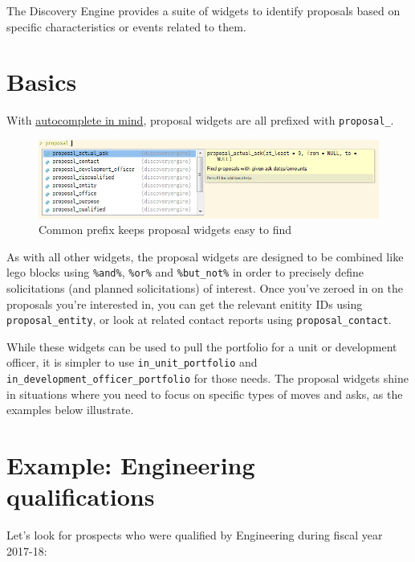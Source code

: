 \documentclass[]{book}
\newenvironment{Shaded}{\begin{snugshade}}{\end{snugshade}}
\newcommand{\DataTypeTok}[1]{\textcolor[rgb]{0.13,0.29,0.53}{#1}}
\newcommand{\DecValTok}[1]{\textcolor[rgb]{0.00,0.00,0.81}{#1}}
\newcommand{\KeywordTok}[1]{\textcolor[rgb]{0.13,0.29,0.53}{\textbf{#1}}}
\newcommand{\NormalTok}[1]{#1}
\newcommand{\OperatorTok}[1]{\textcolor[rgb]{0.81,0.36,0.00}{\textbf{#1}}}
\newcommand{\StringTok}[1]{\textcolor[rgb]{0.31,0.60,0.02}{#1}}
\begin{document}
The Discovery Engine provides a suite of widgets to identify proposals based on specific characteristics or events related to them.

\hypertarget{basics-2}{%
\section{Basics}\label{basics-2}}

With \protect\hyperlink{working-with-autocomplete}{autocomplete in mind}, proposal widgets are all prefixed with \texttt{proposal\_}.

\begin{figure}
\centering
\includegraphics{images/proposal-autocomplete.png}
\caption{Common prefix keeps proposal widgets easy to find}
\end{figure}

As with all other widgets, the proposal widgets are designed to be combined like lego blocks using \texttt{\%and\%}, \texttt{\%or\%} and \texttt{\%but\_not\%} in order to precisely define solicitations (and planned solicitations) of interest. Once you've zeroed in on the proposals you're interested in, you can get the relevant enitity IDs using \texttt{proposal\_entity}, or look at related contact reports using \texttt{proposal\_contact}.

While these widgets can be used to pull the portfolio for a unit or development officer, it is simpler to use \texttt{in\_unit\_portfolio} and \texttt{in\_development\_officer\_portfolio} for those needs. The proposal widgets shine in situations where you need to focus on specific types of moves and asks, as the examples below illustrate.

\hypertarget{example-engineering-qualifications}{%
\section{Example: Engineering qualifications}\label{example-engineering-qualifications}}

Let's look for prospects who were qualified by Engineering during fiscal year 2017-18:

\begin{Shaded}
\end{Shaded}
\end{document}
